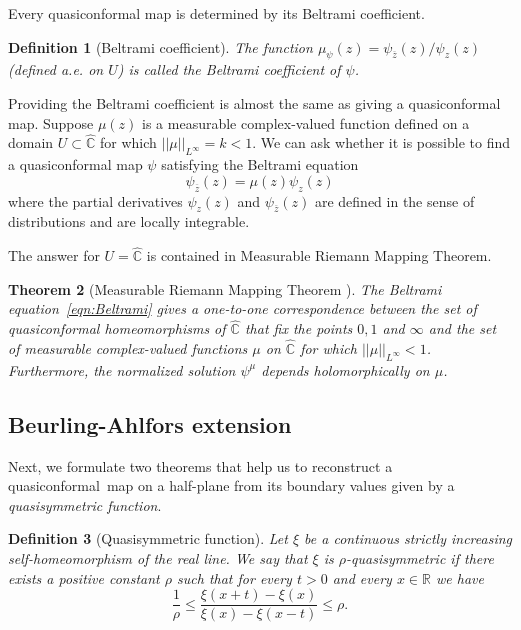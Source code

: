 \documentclass[10pt,reqno,a4paper]{amsart}
\numberwithin{figure}{section}
\numberwithin{equation}{section}
\newtheorem{thm}{Theorem}[section]
\newtheorem{defn}[thm]{Definition}
\newcommand{\qc}{quasiconformal}
\begin{document}
Every quasiconformal map is determined by its Beltrami coefficient.

\begin{defn}[Beltrami coefficient]
	The function $\mu_\psi(z)=\psi_{\overline{z}}(z)/{\psi_z (z)}$ (defined a.e. on $U$) is called the \emph{Beltrami coefficient} of $\psi$.
\end{defn}

Providing the Beltrami coefficient is almost the same as giving a quasiconformal map. Suppose $\mu(z)$ is a measurable complex-valued function defined on a domain $U\subset\hat{\mathbb{C}}$ for which $\lvert\lvert\mu\rvert\rvert_{L^\infty}=k<1$. We can ask whether it is possible to find a quasiconformal map $\psi$ satisfying the Beltrami equation
\begin{equation}
	\label{eqn:Beltrami}
	\psi_{\overline{z}}(z)=\mu (z) \psi_z (z)
\end{equation}
where the partial derivatives $\psi_z (z)$ and $\psi_{\overline{z}}(z)$ are defined in the sense of distributions and are locally integrable.

The answer for $U=\hat{\mathbb{C}}$ is contained in Measurable Riemann Mapping Theorem.

\begin{thm}[Measurable Riemann Mapping Theorem \cite{Gardiner}]
	The Beltrami equation~\ref{eqn:Beltrami} gives a one-to-one correspondence between the set of quasiconformal homeomorphisms of $\hat{\mathbb{C}}$ that fix the points $0,1$ and $\infty$ and the set of measurable complex-valued functions $\mu$ on $\hat{\mathbb{C}}$ for which $\lvert\lvert\mu\rvert\rvert_{L^\infty}<1$. Furthermore, the normalized solution $\psi^\mu$ depends holomorphically on $\mu$.
\end{thm}

\subsection{Beurling-Ahlfors extension}

Next, we formulate two theorems that help us to reconstruct a \qc\ map on a half-plane from its boundary values given by a \emph{quasisymmetric function}.

\begin{defn}[Quasisymmetric function]
	\label{defn:quasisymmetry}
	Let $\xi$ be a continuous strictly increasing self-homeomorphism of the real line. We say that $\xi$ is \emph{$\rho$-quasisymmetric} if there exists a positive constant $\rho$ such that for every $t>0$ and every $x\in\mathbb{R}$ we have
	$$\frac{1}{\rho}\leq\frac{\xi(x+t)-\xi(x)}{\xi(x)-\xi(x-t)}\leq\rho.$$
\end{defn}
\end{document}
